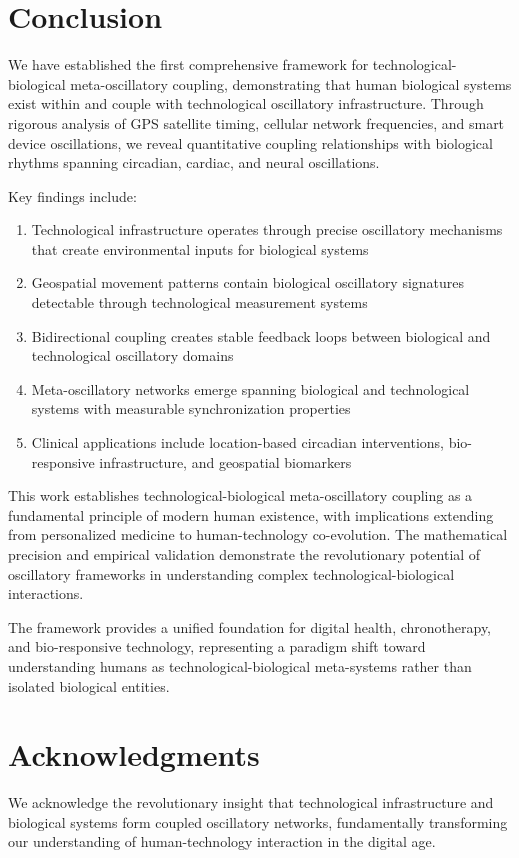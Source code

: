 \documentclass[12pt]{article}
\begin{document}
\section{Conclusion}

We have established the first comprehensive framework for technological-biological meta-oscillatory coupling, demonstrating that human biological systems exist within and couple with technological oscillatory infrastructure. Through rigorous analysis of GPS satellite timing, cellular network frequencies, and smart device oscillations, we reveal quantitative coupling relationships with biological rhythms spanning circadian, cardiac, and neural oscillations.

Key findings include:

\begin{enumerate}
\item Technological infrastructure operates through precise oscillatory mechanisms that create environmental inputs for biological systems
\item Geospatial movement patterns contain biological oscillatory signatures detectable through technological measurement systems
\item Bidirectional coupling creates stable feedback loops between biological and technological oscillatory domains
\item Meta-oscillatory networks emerge spanning biological and technological systems with measurable synchronization properties
\item Clinical applications include location-based circadian interventions, bio-responsive infrastructure, and geospatial biomarkers
\end{enumerate}

This work establishes technological-biological meta-oscillatory coupling as a fundamental principle of modern human existence, with implications extending from personalized medicine to human-technology co-evolution. The mathematical precision and empirical validation demonstrate the revolutionary potential of oscillatory frameworks in understanding complex technological-biological interactions.

The framework provides a unified foundation for digital health, chronotherapy, and bio-responsive technology, representing a paradigm shift toward understanding humans as technological-biological meta-systems rather than isolated biological entities.

\section*{Acknowledgments}

We acknowledge the revolutionary insight that technological infrastructure and biological systems form coupled oscillatory networks, fundamentally transforming our understanding of human-technology interaction in the digital age.



\end{document}
